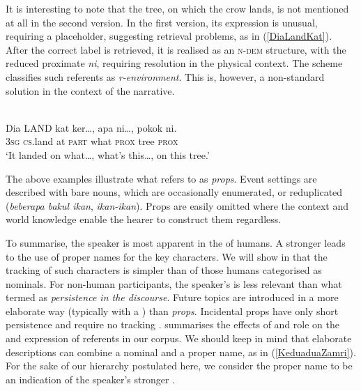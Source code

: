 \documentclass[output=paper
,modfonts
,nonflat]{langsci/langscibook}
\begin{document}
\noindent
It is interesting to note that the tree, on which the crow lands, is not mentioned at all in the second version. In the first version, its expression is unusual, requiring a placeholder, suggesting retrieval problems, as in (\ref{DiaLandKat}). After the correct label is retrieved, it is realised as an \textsc{n-dem} structure, with the reduced proximate \emph{ni}, requiring resolution in the physical context. The  scheme classifies such referents as \emph{r-environment}. This is, however, a non-standard solution in the context of the narrative.

\ea\label{DiaLandKat} 
\\
\gll Dia LAND    kat   ker\ldots, apa  ni\ldots,  pokok ni.\\
\textsc{3sg} \textsc{cs}.land at    \textsc{part}   what \textsc{prox}  tree  \textsc{prox}\\
\glt `It landed on what\ldots, what's this\ldots, on this tree.'
\z

\noindent
The above examples illustrate what \cite[313]{Hopper1986} refers to as \emph{props}. Event settings are described with bare nouns, which are occasionally enumerated, or reduplicated (\emph{beberapa bakul ikan}, \emph{ikan-ikan}). Props are easily omitted where the context and world knowledge enable the hearer to construct them regardless. 

To summarise, the speaker  is most apparent in the  of humans. A stronger  leads to the use of proper names for the key characters. We will show in  that the tracking of such characters is simpler than of those humans categorised as nominals. For non-human participants, the speaker's  is less relevant than what \cite[319]{Hopper1986} termed as \emph{persistence in the discourse}. Future topics are introduced in a more elaborate way (typically with a ) than \emph{props}. Incidental props have only short persistence and require no tracking \citep[cf.][320]{Hopper1986}.  summarises the effects of  and  role on the  and expression of referents in our  corpus. We should keep in mind that elaborate descriptions can combine a nominal and a proper name, as in (\ref{KeduaduaZamri}). For the sake of our hierarchy postulated here, we consider the proper name to be an indication of the speaker's stronger .
\end{document}
